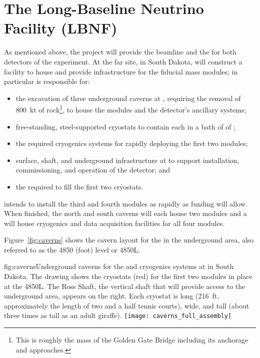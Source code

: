 \section{The Long-Baseline Neutrino Facility (LBNF)} 
\label{sec:exec:lbnf}

As mentioned above, the  project will provide the beamline and the  for both detectors of the  experiment. At the far site,  in South Dakota,  will construct a facility to house and provide infrastructure for the   \nominalmodsize fiducial mass  modules; in particular  is responsible for:

\begin{itemize}

\item the excavation of three underground caverns at , requiring the removal of \SI{800}{kt} of rock\footnote{This is roughly the mass of the Golden Gate Bridge including its anchorage and approaches.}, to house the   modules and the detector's ancillary systems;

 \item free-standing, steel-supported cryostats to contain each  in a bath of \larmass of ;   
 \item the required cryogenics systems for rapidly deploying the first two modules;

\item surface, shaft, and underground infrastructure at   to support installation, commissioning, and operation of the detector; and

\item the  required to fill the first two cryostats.
\end{itemize}

 intends to install the third and fourth  modules as rapidly as funding will 
allow. When finished, the north and south caverns will each house two modules and a  will house cryogenics and data acquisition facilities for all four modules.

Figure~\ref{fig:caverns} shows the cavern layout for the  in the  underground area, also referred to as the 4850 (foot) level or 4850L.  


\begin{dunefigure}{fig:caverns}{Underground caverns for the   and cryogenics systems at  in South Dakota. The drawing shows the cryostats (red) for the first two  modules  in place at the 4850L. The Ross Shaft, the vertical shaft that will provide access to the  underground area, appears on the right. 
Each cryostat is \cryostatlen long (\SI{216}{ft}, approximately the length of two and a half tennis courts), \cryostatwdth wide, and \cryostatht tall (about three times as tall as an adult giraffe).}
\texttt{[image: caverns\_full\_assembly]}
\end{dunefigure}




